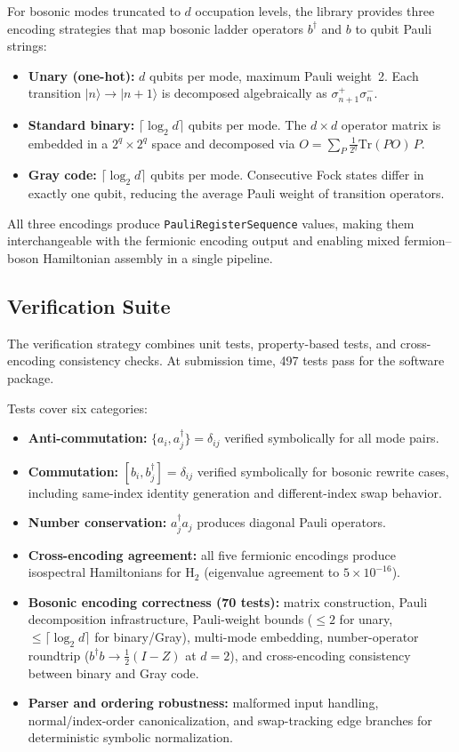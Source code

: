 \documentclass[10pt,a4paper]{article}
\begin{document}
For bosonic modes truncated to $d$ occupation levels, the library
provides three encoding strategies that map bosonic ladder operators
$b^\dagger$ and $b$ to qubit Pauli strings:

\begin{itemize}
  \item \textbf{Unary (one-hot):} $d$ qubits per mode, maximum Pauli
    weight~2.  Each transition $|n\rangle \to |n{+}1\rangle$ is
    decomposed algebraically as $\sigma^+_{n+1}\sigma^-_n$.
  \item \textbf{Standard binary:} $\lceil\log_2 d\rceil$ qubits per
    mode.  The $d \times d$ operator matrix is embedded in a
    $2^q \times 2^q$ space and decomposed via
    $O = \sum_P \tfrac{1}{2^q}\text{Tr}(PO)\,P$.
  \item \textbf{Gray code:} $\lceil\log_2 d\rceil$ qubits per mode.
    Consecutive Fock states differ in exactly one qubit, reducing the
    average Pauli weight of transition operators.
\end{itemize}

All three encodings produce \texttt{PauliRegisterSequence} values,
making them interchangeable with the fermionic encoding output and
enabling mixed fermion--boson Hamiltonian assembly in a single pipeline.

\subsection*{Verification Suite}

The verification strategy combines unit tests, property-based tests, and
cross-encoding consistency checks.  At submission time, 497 tests pass
for the software package.

Tests cover six categories:
\begin{itemize}
  \item \textbf{Anti-commutation:}
    $\{a_i, a^\dagger_j\} = \delta_{ij}$ verified symbolically for all
    mode pairs.
  \item \textbf{Commutation:}
    $[b_i, b^\dagger_j] = \delta_{ij}$ verified symbolically for bosonic
    rewrite cases, including same-index identity generation and
    different-index swap behavior.
  \item \textbf{Number conservation:}
    $a^\dagger_j a_j$ produces diagonal Pauli operators.
  \item \textbf{Cross-encoding agreement:} all five fermionic encodings
    produce isospectral Hamiltonians for H$_2$ (eigenvalue agreement to
    $5 \times 10^{-16}$).
  \item \textbf{Bosonic encoding correctness (70 tests):}
    matrix construction, Pauli decomposition infrastructure,
    Pauli-weight bounds ($\leq 2$ for unary, $\leq \lceil\log_2 d\rceil$
    for binary/Gray), multi-mode embedding, number-operator roundtrip
    ($b^\dagger b \to \tfrac{1}{2}(I - Z)$ at $d = 2$), and
    cross-encoding consistency between binary and Gray code.
  \item \textbf{Parser and ordering robustness:} malformed input handling,
    normal/index-order canonicalization, and swap-tracking edge branches for
    deterministic symbolic normalization.
\end{itemize}
\end{document}
